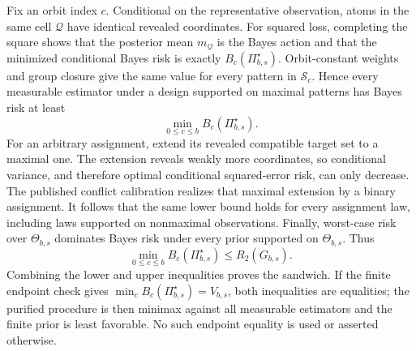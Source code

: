 Fix an orbit index \(c\). Conditional on the representative observation, atoms in the same cell \(\mathcal Q\) have identical revealed coordinates. For squared loss, completing the square shows that the posterior mean \(m_{\mathcal Q}\) is the Bayes action and that the minimized conditional Bayes risk is exactly \(B_c(\Pi_{b,s}^{\star})\). Orbit-constant weights and group closure give the same value for every pattern in \(\mathcal S_c\). Hence every measurable estimator under a design supported on maximal patterns has Bayes risk at least
\[
\min_{0\le c\le b}B_c(\Pi_{b,s}^{\star}).
\]
For an arbitrary assignment, extend its revealed compatible target set to a maximal one. The extension reveals weakly more coordinates, so conditional variance, and therefore optimal conditional squared-error risk, can only decrease. The published conflict calibration realizes that maximal extension by a binary assignment. It follows that the same lower bound holds for every assignment law, including laws supported on nonmaximal observations. Finally, worst-case risk over \(\Theta_{b,s}\) dominates Bayes risk under every prior supported on \(\Theta_{b,s}\). Thus
\[
\min_{0\le c\le b}B_c(\Pi_{b,s}^{\star})
\le R_2(G_{b,s}).
\]
Combining the lower and upper inequalities proves the sandwich. If the finite endpoint check gives \(\min_cB_c(\Pi_{b,s}^{\star})=V_{b,s}\), both inequalities are equalities; the purified procedure is then minimax against all measurable estimators and the finite prior is least favorable. No such endpoint equality is used or asserted otherwise.